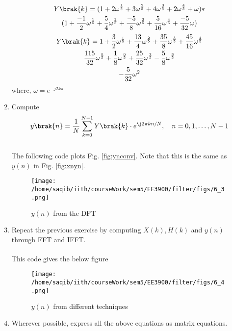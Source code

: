\documentclass[journal,12pt,twocolumn]{IEEEtran}
\renewcommand\thesection{\arabic{section}}
\begin{document}
\begin{enumerate}[label=\thesection.\arabic*]
\begin{multline}
	Y\brak{k}= (1+2\omega^{\frac{1}{5}}+3\omega^{\frac{2}{5}}+4\omega^{\frac{3}{5}}+2\omega^{\frac{4}{5}}+\omega)* \\(1+\frac{-1}{2}\omega^{\frac{1}{5}}+\frac{5}{4}\omega^{\frac{2}{5}}+\frac{-5}{8}\omega^{\frac{3}{5}}+\frac{5}{16}\omega^{\frac{4}{5}}+\frac{-5}{32}\omega)
\end{multline}
\begin{multline}
	Y\brak{k}= 1+\frac{3}{2}\omega^{\frac{1}{5}}+\frac{13}{4}\omega^{\frac{2}{5}}+\frac{35}{8}\omega^{\frac{3}{5}}+\frac{45}{16}\omega^{\frac{4}{5}}\\\frac{115}{32}\omega^{\frac{5}{5}}+\frac{1}{8}\omega^{\frac{6}{5}}+\frac{25}{32}\omega^{\frac{7}{5}}-\frac{5}{8}\omega^{\frac{8}{5}}\\-\frac{5}{32}\omega^{2} 
\end{multline}
where, $\omega=e^{-j2k\pi}$
\item Compute
\begin{equation}
 y\brak{n}={\frac {1}{N}}\sum _{k=0}^{N-1}Y\brak{k}\cdot e^{\j 2\pi kn/N},\quad n = 0,1,\dots, N-1
\end{equation}
\\
\solution The following code plots Fig. \ref{fig:ynconv}. Note that this is the same as 
$y(n)$ in  Fig. 
\ref{fig:xnyn}. 
%

\begin{figure}[!ht]
\centering
\texttt{[image: /home/saqib/iith/courseWork/sem5/EE3900/filter/figs/6\_3.png]}
\caption{$y(n)$ from the DFT}
\label{fig:yndft}
\end{figure}
\item Repeat the previous exercise by computing $X(k), H(k)$ and $y(n)$ through FFT and 
IFFT.
\\\solution\\

This code gives the below figure
\begin{figure}[!ht]
	\centering
	\texttt{[image: /home/saqib/iith/courseWork/sem5/EE3900/filter/figs/6\_4.png]}
	\caption{$y(n)$ from different techniques}
	\label{fig:yndft}
	\end{figure}
\item Wherever possible, express all the above equations as matrix equations.
\\\solution\\

\end{enumerate}
\end{document}
